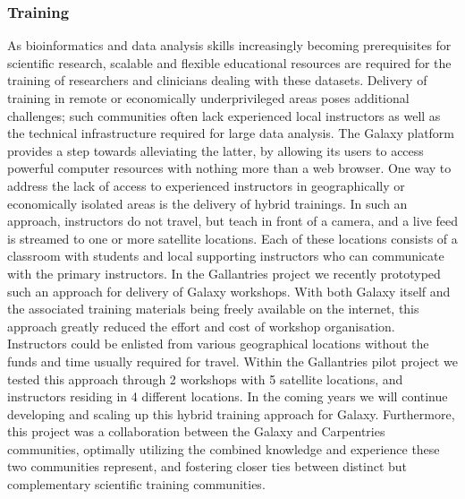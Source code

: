 \subsubsection{Training}
As bioinformatics and data analysis skills increasingly becoming prerequisites for scientific research, scalable and flexible educational resources are required for the training of researchers and clinicians dealing with these datasets.
Delivery of training in remote or economically underprivileged areas poses additional challenges; such communities often lack experienced local instructors as well as the technical infrastructure required for large data analysis.
The Galaxy platform provides a step towards alleviating the latter, by allowing its users to access powerful computer resources with nothing more than a web browser. One way to address the lack of access to experienced instructors in geographically or economically isolated areas is the delivery of hybrid trainings.
In such an approach, instructors do not travel, but teach in front of a camera, and a live feed is streamed to one or more satellite locations. Each of these locations consists of a classroom with students and local supporting instructors who can communicate with the primary instructors. In the Gallantries project \cite{gallantries} we recently prototyped such an approach for delivery of Galaxy workshops.
With both Galaxy itself and the associated training materials being freely available on the internet, this approach greatly reduced the effort and cost of workshop organisation.
Instructors could be enlisted from various geographical locations without the funds and time usually required for travel. Within the Gallantries pilot project we tested this approach through 2 workshops with 5 satellite locations, and instructors residing in 4 different locations.
In the coming years we will continue developing and scaling up this hybrid training approach for Galaxy. Furthermore, this project was a collaboration between the Galaxy and Carpentries \cite{wilson2006software} communities, optimally utilizing the combined knowledge and experience these two communities represent, and fostering closer ties between distinct but complementary scientific training communities.

